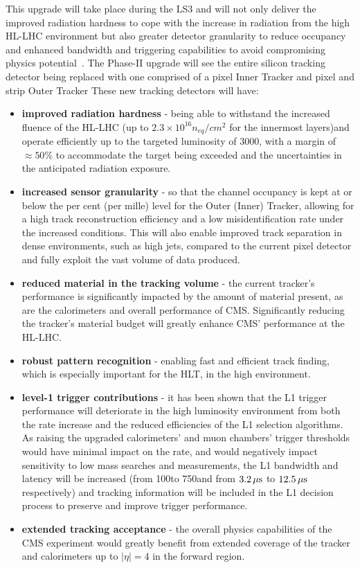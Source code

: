 This upgrade will take place during the LS3 and will not only deliver the improved radiation hardness to cope with the increase in radiation from the high \PU HL-LHC environment but also greater detector granularity to reduce occupancy and enhanced bandwidth and triggering capabilities to avoid compromising physics potential~\cite{CMSCollaboration:2015zni,P2TrackerTDR}.
The Phase-II upgrade will see the entire silicon tracking detector being replaced with one comprised of a pixel Inner Tracker and pixel and strip Outer Tracker
These new tracking detectors will have:
\begin{itemize}
\item \textbf{improved radiation hardness} - being able to withstand the increased fluence of the HL-LHC (up to $2.3\times10^{16} n_{eq}/cm^{2}$ for the innermost layers)and operate efficiently up to the targeted luminosity of 3000\fbinv, with a margin of $\approx50\%$ to accommodate the target being exceeded and the uncertainties in the anticipated radiation exposure.
\item \textbf{increased sensor granularity} - so that the channel occupancy is kept at or below the per cent (per mille) level for the Outer (Inner) Tracker, allowing for a high track reconstruction efficiency and a low misidentification rate under the increased \PU conditions. This will also enable improved track separation in dense environments, such as high \pT jets, compared to the current pixel detector and fully exploit the vast volume of data produced.
\item \textbf{reduced material in the tracking volume} - the current tracker's performance is significantly impacted by the amount of material present, as are the calorimeters and overall performance of CMS.
Significantly reducing the tracker's material budget will greatly enhance CMS' performance at the HL-LHC.
\item \textbf{robust pattern recognition} - enabling fast and efficient track finding, which is especially important for the HLT, in the high \PU environment.
\item \textbf{level-1 trigger contributions} - it has been shown that the L1 trigger performance will deteriorate in the high luminosity environment from both the rate increase and the reduced efficiencies of the L1 selection algorithms.
As raising the upgraded calorimeters' and muon chambers' trigger thresholds would have minimal impact on the rate, and would negatively impact sensitivity to low mass searches and measurements, the L1 bandwidth and latency will be increased (from 100\kHz to 750\kHz and from $3.2\,\mu\text{s}$ to $12.5\,\mu\text{s}$ respectively) and tracking information will be included in the L1 decision process to preserve and improve trigger performance.
\item \textbf{extended tracking acceptance} - the overall physics capabilities of the CMS experiment would greatly benefit from extended coverage of the tracker and calorimeters up to $|\eta| = 4$ in the forward region.
\end{itemize}


